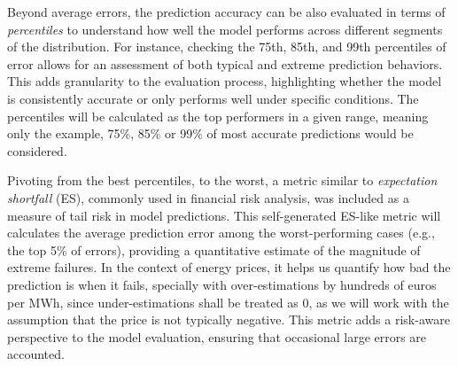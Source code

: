 \documentclass[12pt]{report} %
\begin{document}
Beyond average errors, the prediction accuracy can be also evaluated in terms of \textit{percentiles} to understand how well the model performs across different segments of the distribution. For instance, checking the 75th, 85th, and 99th percentiles of error allows for an assessment of both typical and extreme prediction behaviors. This adds granularity to the evaluation process, highlighting whether the model is consistently accurate or only performs well under specific conditions. The percentiles will be calculated as the top performers in a given range, meaning only the example, 75\%, 85\% or 99\% of most accurate predictions would be considered.

Pivoting from the best percentiles, to the worst, a metric similar to \textit{expectation shortfall} (ES), commonly used in financial risk analysis, was included as a measure of tail risk in model predictions. This self-generated ES-like metric will calculates the average prediction error among the worst-performing cases (e.g., the top 5\% of errors), providing a quantitative estimate of the magnitude of extreme failures. In the context of energy prices, it helps us quantify how bad the prediction is when it fails, specially with over-estimations by hundreds of euros per MWh, since under-estimations shall be treated as 0, as we will work with the assumption that the price is not typically negative. This metric adds a risk-aware perspective to the model evaluation, ensuring that occasional large errors are accounted.


\end{document}
